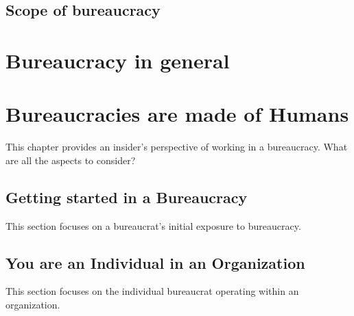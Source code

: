 \documentclass{book}
\begin{document}
  \section{Scope of bureaucracy}
    

\chapter{Bureaucracy in general}
   \clearpage
   \clearpage
  \clearpage
  \clearpage
   \clearpage
   \clearpage
   \clearpage
   \clearpage

\chapter{Bureaucracies are made of Humans\label{b_made_of_humans}}

This chapter provides an insider's perspective of working in a bureaucracy. What are all the aspects to consider?

  \section{Getting started in a Bureaucracy}
    This section focuses on a bureaucrat's initial exposure to bureaucracy. 
  
    
    
    
    
    
  \newpage
  \section{You are an Individual in an Organization}
  
    This section focuses on the individual bureaucrat operating within an organization. 
    
\end{document}

